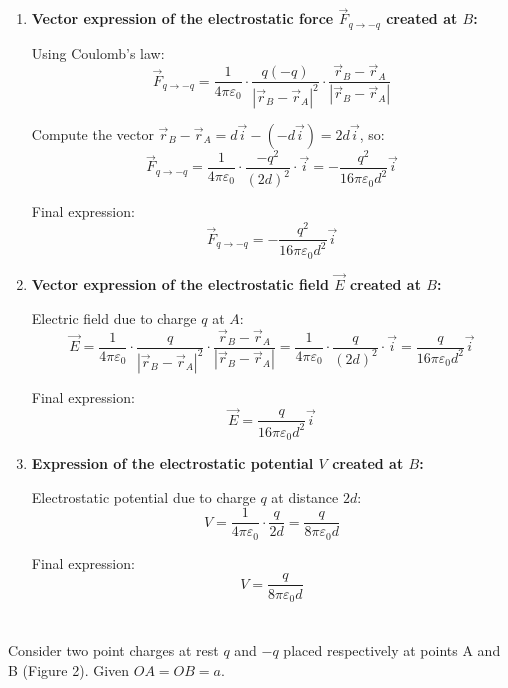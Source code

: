 \documentclass[12pt]{article}
\begin{document}
\begin{answerbox}
    \begin{enumerate}
        \item \textbf{Vector expression of the electrostatic force $ \vec{F}_{q \to -q} $ created at $ B $:}
    
        Using Coulomb's law:
        $$
        \vec{F}_{q \to -q} = \frac{1}{4\pi\varepsilon_0} \cdot \frac{q(-q)}{|\vec{r}_B - \vec{r}_A|^2} \cdot \frac{\vec{r}_B - \vec{r}_A}{|\vec{r}_B - \vec{r}_A|}
        $$
    
        Compute the vector $ \vec{r}_B - \vec{r}_A = d\vec{i} - (-d\vec{i}) = 2d\vec{i} $, so:
        $$
        \vec{F}_{q \to -q} = \frac{1}{4\pi\varepsilon_0} \cdot \frac{-q^2}{(2d)^2} \cdot \vec{i}
        = -\frac{q^2}{16\pi\varepsilon_0 d^2} \vec{i}
        $$
    
        Final expression:
        $$
        \boxed{\vec{F}_{q \to -q} = -\frac{q^2}{16\pi\varepsilon_0 d^2} \vec{i}}
        $$
    
        \item \textbf{Vector expression of the electrostatic field $ \vec{E} $ created at $ B $:}
    
        Electric field due to charge $ q $ at $ A $:
        $$
        \vec{E} = \frac{1}{4\pi\varepsilon_0} \cdot \frac{q}{|\vec{r}_B - \vec{r}_A|^2} \cdot \frac{\vec{r}_B - \vec{r}_A}{|\vec{r}_B - \vec{r}_A|}
        = \frac{1}{4\pi\varepsilon_0} \cdot \frac{q}{(2d)^2} \cdot \vec{i}
        = \frac{q}{16\pi\varepsilon_0 d^2} \vec{i}
        $$
    
        Final expression:
        $$
        \boxed{\vec{E} = \frac{q}{16\pi\varepsilon_0 d^2} \vec{i}}
        $$
    
        \item \textbf{Expression of the electrostatic potential $ V $ created at $ B $:}
    
        Electrostatic potential due to charge $ q $ at distance $ 2d $:
        $$
        V = \frac{1}{4\pi\varepsilon_0} \cdot \frac{q}{2d}
        = \frac{q}{8\pi\varepsilon_0 d}
        $$
    
        Final expression:
        $$
        \boxed{V = \frac{q}{8\pi\varepsilon_0 d}}
        $$
    \end{enumerate}
\end{answerbox}

\newpage

\section{}
Consider two point charges at rest $q$ and $-q$ placed respectively at points A and B (Figure 2).
Given $OA = OB = a$.
\end{document}
